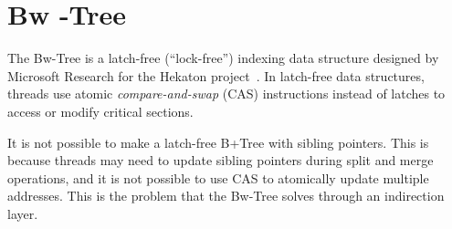 \documentclass[11pt]{article}
\begin{document}
%     
% 
%     
% 
%     
%     

\section{Bw -Tree}
The Bw-Tree is a latch-free (``lock-free'') indexing data structure designed by Microsoft Research 
for the Hekaton project~\cite{bwtree-icde2013}. In latch-free data structures, threads use atomic 
\textit{compare-and-swap} (CAS) instructions instead of latches to access or modify critical 
sections.

It is not possible to make a latch-free B+Tree with sibling pointers. This is because threads may 
need to update sibling pointers during split and merge operations, and it is not possible to use 
CAS to atomically update multiple addresses. This is the problem that the Bw-Tree solves through an 
indirection layer.
\end{document}
